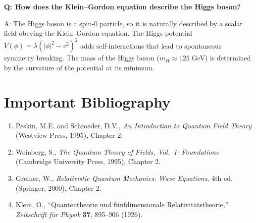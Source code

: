 \textbf{Q: How does the Klein--Gordon equation describe the Higgs boson?}

A: The Higgs boson is a spin-0 particle, so it is naturally described by a scalar field obeying the Klein--Gordon equation. The Higgs potential $V(\phi) = \lambda(|\phi|^2 - v^2)^2$ adds self-interactions that lead to spontaneous symmetry breaking. The mass of the Higgs boson ($m_H \approx 125$ GeV) is determined by the curvature of the potential at its minimum.
\section*{Important Bibliography}

\begin{enumerate}
\item Peskin, M.E. and Schroeder, D.V., \textit{An Introduction to Quantum Field Theory} (Westview Press, 1995), Chapter 2.
\item Weinberg, S., \textit{The Quantum Theory of Fields, Vol.\ 1: Foundations} (Cambridge University Press, 1995), Chapter 2.
\item Greiner, W., \textit{Relativistic Quantum Mechanics: Wave Equations}, 4th ed. (Springer, 2000), Chapter 2.
\item Klein, O., ``Quantentheorie und f\"unfdimensionale Relativit\"atstheorie,'' \textit{Zeitschrift f\"ur Physik} \textbf{37}, 895--906 (1926).
\end{enumerate}

